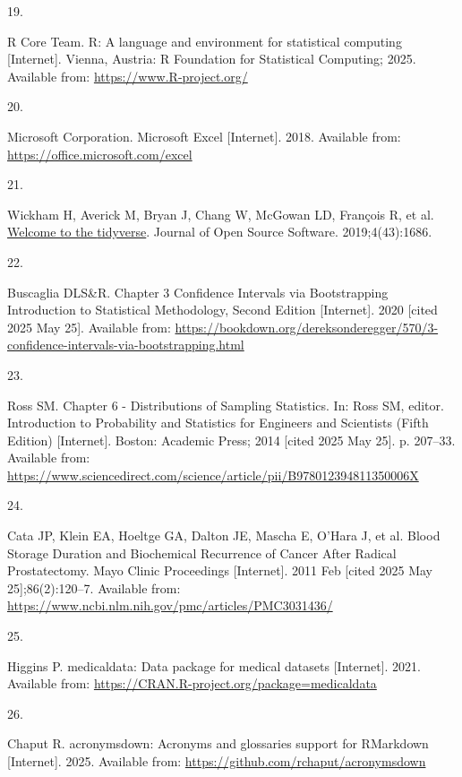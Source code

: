 \documentclass[
]{article}
\newlength{\cslhangindent}
\newlength{\csllabelwidth}
\newenvironment{CSLReferences}[2] %
 {\begin{list}{}{%
  \setlength{\itemindent}{0pt}
  \setlength{\leftmargin}{0pt}
  \setlength{\parsep}{0pt}
  \ifodd #1
   \setlength{\leftmargin}{\cslhangindent}
   \setlength{\itemindent}{-1\cslhangindent}
  \fi
  \setlength{\itemsep}{#2\baselineskip}}}
 {\end{list}}
\newcommand{\CSLLeftMargin}[1]{\parbox[t]{\csllabelwidth}{\strut#1\strut}}
\newcommand{\CSLRightInline}[1]{\parbox[t]{\linewidth - \csllabelwidth}{\strut#1\strut}}
\begin{document}
\begin{CSLReferences}{0}{1}
\CSLLeftMargin{19. }%
\CSLRightInline{R Core Team. {R}: A language and environment for statistical computing {[}Internet{]}. Vienna, Austria: R Foundation for Statistical Computing; 2025. Available from: \url{https://www.R-project.org/}}

\CSLLeftMargin{20. }%
\CSLRightInline{Microsoft Corporation. Microsoft {Excel} {[}Internet{]}. 2018. Available from: \url{https://office.microsoft.com/excel}}

\CSLLeftMargin{21. }%
\CSLRightInline{Wickham H, Averick M, Bryan J, Chang W, McGowan LD, François R, et al. \href{https://doi.org/10.21105/joss.01686}{Welcome to the {tidyverse}}. Journal of Open Source Software. 2019;4(43):1686. }

\CSLLeftMargin{22. }%
\CSLRightInline{Buscaglia DLS\&R. Chapter 3 {Confidence} {Intervals} via {Bootstrapping} {\textbar} {Introduction} to {Statistical} {Methodology}, {Second} {Edition} {[}Internet{]}. 2020 {[}cited 2025 May 25{]}. Available from: \url{https://bookdown.org/dereksonderegger/570/3-confidence-intervals-via-bootstrapping.html}}

\CSLLeftMargin{23. }%
\CSLRightInline{Ross SM. Chapter 6 - {Distributions} of {Sampling} {Statistics}. In: Ross SM, editor. Introduction to {Probability} and {Statistics} for {Engineers} and {Scientists} ({Fifth} {Edition}) {[}Internet{]}. Boston: Academic Press; 2014 {[}cited 2025 May 25{]}. p. 207--33. Available from: \url{https://www.sciencedirect.com/science/article/pii/B978012394811350006X}}

\CSLLeftMargin{24. }%
\CSLRightInline{Cata JP, Klein EA, Hoeltge GA, Dalton JE, Mascha E, O'Hara J, et al. Blood {Storage} {Duration} and {Biochemical} {Recurrence} of {Cancer} {After} {Radical} {Prostatectomy}. Mayo Clinic Proceedings {[}Internet{]}. 2011 Feb {[}cited 2025 May 25{]};86(2):120--7. Available from: \url{https://www.ncbi.nlm.nih.gov/pmc/articles/PMC3031436/}}

\CSLLeftMargin{25. }%
\CSLRightInline{Higgins P. {medicaldata}: Data package for medical datasets {[}Internet{]}. 2021. Available from: \url{https://CRAN.R-project.org/package=medicaldata}}

\CSLLeftMargin{26. }%
\CSLRightInline{Chaput R. {acronymsdown}: Acronyms and glossaries support for RMarkdown {[}Internet{]}. 2025. Available from: \url{https://github.com/rchaput/acronymsdown}}


\end{CSLReferences}
\end{document}
